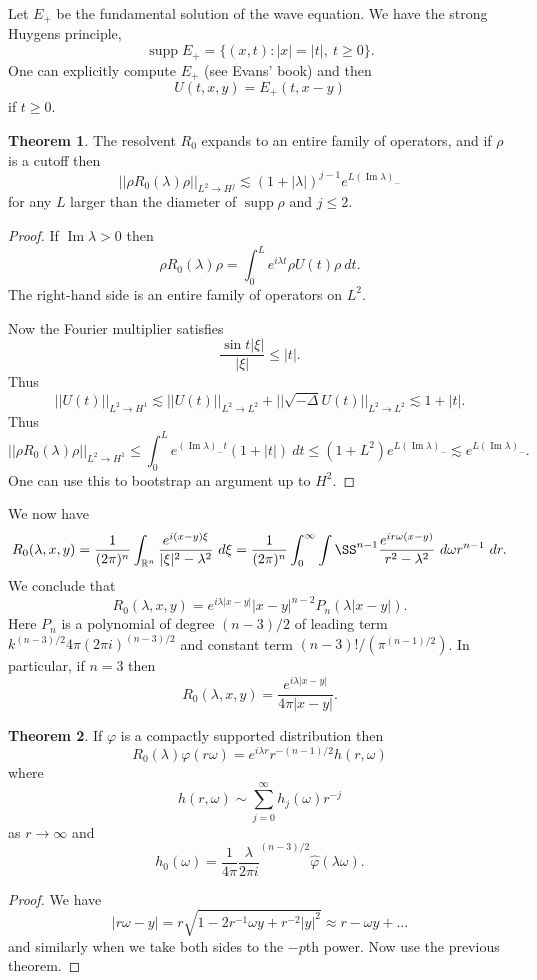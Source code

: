 \documentclass[12pt]{report}
\newcommand{\RR}{\mathbb{R}}
\newcommand{\supp}{\operatorname{supp}}
\renewcommand{\Im}{\operatorname{Im}}
\theoremstyle{definition}
\newtheorem{theorem}{Theorem}[chapter]
\begin{document}
Let $E_+$ be the fundamental solution of the wave equation. We have the strong Huygens principle,
$$\supp E_+ = \{(x, t): |x| = |t|, ~t \geq 0\}.$$
One can explicitly compute $E_+$ (see Evans' book) and then
$$U(t, x, y) = E_+(t, x - y)$$
if $t \geq 0$.
\begin{theorem}
The resolvent $R_0$ expands to an entire family of operators, and if $\rho$ is a cutoff then
$$||\rho R_0(\lambda) \rho||_{L^2 \to H^j} \lesssim (1 + |\lambda|)^{j-1} e^{L(\Im \lambda)_-}$$
for any $L$ larger than the diameter of $\supp \rho$ and $j \leq 2$.
\end{theorem}
\begin{proof}
If $\Im \lambda > 0$ then
$$\rho R_0(\lambda) \rho = \int_0^L e^{i\lambda t}\rho U(t)\rho~dt.$$
The right-hand side is an entire family of operators on $L^2$.

Now the Fourier multiplier satisfies
$$\frac{\sin t|\xi|}{|\xi|} \leq |t|.$$
Thus
$$||U(t)||_{L^2 \to H^1} \lesssim ||U(t)||_{L^2 \to L^2} + ||\sqrt{-\Delta}U(t)||_{L^2 \to L^2} \lesssim 1 + |t|.$$
Thus
$$||\rho R_0(\lambda) \rho||_{L^2 \to H^1} \leq \int_0^L e^{(\Im \lambda)_- t}(1 + |t|) ~dt \leq (1 + L^2)e^{L(\Im \lambda)_-} \lesssim e^{L(\Im \lambda)_-}.$$
One can use this to bootstrap an argument up to $H^2$.
\end{proof}
We now have
$$R_0(\lambda, x, y) = \frac{1}{(2\pi)^n} \int_{\RR^n} \frac{e^{i(x-y)\xi}}{|\xi|^2 - \lambda^2}~d\xi
= \frac{1}{(2\pi)^n} \int_0^\infty \int{\SS^{n-1}} \frac{e^{ir\omega(x-y)}}{r^2 - \lambda^2}~d\omega r^{n-1}~dr.$$
We conclude that
$$R_0(\lambda, x, y) = e^{i\lambda|x-y|}{|x-y|^{n-2}} P_n(\lambda|x-y|).$$
Here $P_n$ is a polynomial of degree $(n-3)/2$ of leading term $k^{(n-3)/2}{4\pi(2\pi i)^{(n-3)/2}}$ and constant term $(n-3)!/(\pi^{(n-1)/2})$. In particular, if $n = 3$ then
$$R_0(\lambda, x, y) = \frac{e^{i\lambda|x-y|}}{4\pi|x-y|}.$$
\begin{theorem}
If $\varphi$ is a compactly supported distribution then
$$R_0(\lambda)\varphi(r\omega) = e^{i\lambda r}r^{-(n-1)/2}h(r, \omega)$$
where
$$h(r, \omega) \sim \sum_{j=0}^\infty h_j(\omega)r^{-j}$$
as $r \to \infty$ and
$$h_0(\omega) = \frac{1}{4\pi}\frac{\lambda}{2\pi i}^{(n-3)/2}\hat \varphi(\lambda\omega).$$
\end{theorem}
\begin{proof}
We have
$$|r\omega - y| = r\sqrt{1 - 2r^{-1}\omega y + r^{-2}|y|^2} \approx r - \omega y + \dots$$
and similarly when we take both sides to the $-p$th power.
Now use the previous theorem.
\end{proof}
\end{document}
